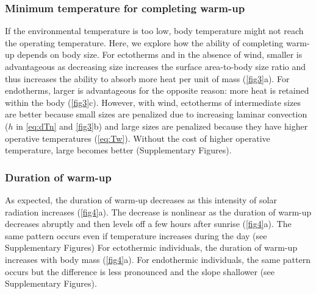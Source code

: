 \subsubsection*{Minimum temperature for completing warm-up}
If the environmental temperature is too low, body temperature might not reach the operating temperature.
Here, we explore how the ability of completing warm-up depends on body size.
For ectotherms and in the absence of wind, smaller is advantageous as decreasing size increases the surface area-to-body size ratio and thus increases the ability to absorb more heat per unit of mass  (\cref{fig3}a).
For endotherms, larger is advantageous for the opposite reason: more heat is retained within the body  (\cref{fig3}c).
However, with wind, ectotherms of intermediate sizes are better because small sizes are penalized due to increasing laminar convection ($h$ in \cref{eq:dTn} and \cref{fig3}b)  and large sizes are penalized because they have higher operative temperatures (\cref{eq:Tw}).
Without the cost of higher operative temperature, large becomes better (Supplementary Figures).
\subsubsection*{Duration of warm-up}
As expected, the duration of warm-up decreases as this intensity of solar radiation increases (\cref{fig4}a).
The decrease is nonlinear as the duration of  warm-up decreases abruptly and then levels off a few hours after sunrise (\cref{fig4}a).
The same pattern occurs even if temperature increases during the day (see Supplementary Figures)
For ectothermic individuals, the duration of warm-up increases with body mass (\cref{fig4}a).
For endothermic individuals, the same pattern occurs but the difference is less pronounced and the slope shallower (see Supplementary Figures).

